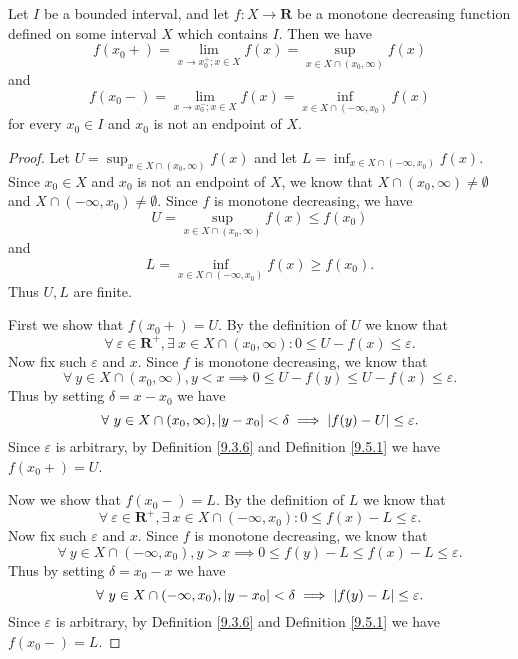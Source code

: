 \begin{additional corollary}\label{ac 11.8.2}
Let \(I\) be a bounded interval, and let \(f : X \to \mathbf{R}\) be a monotone decreasing function defined on some interval \(X\) which contains \(I\).
Then we have
\[
    f(x_0+) = \lim_{x \to x_0^+ ; x \in X} f(x) = \sup_{x \in X \cap (x_0, \infty)} f(x)
\]
and
\[
    f(x_0-) = \lim_{x \to x_0^- ; x \in X} f(x) = \inf_{x \in X \cap (-\infty, x_0)} f(x)
\]
for every \(x_0 \in I\) and \(x_0\) is not an endpoint of \(X\).
\end{additional corollary}

\begin{proof}
    Let \(U = \sup_{x \in X \cap (x_0, \infty)} f(x)\) and let \(L = \inf_{x \in X \cap (-\infty, x_0)} f(x)\).
    Since \(x_0 \in X\) and \(x_0\) is not an endpoint of \(X\), we know that \(X \cap (x_0, \infty) \neq \emptyset\) and \(X \cap (-\infty, x_0) \neq \emptyset\).
    Since \(f\) is monotone decreasing, we have
    \[
        U = \sup_{x \in X \cap (x_0, \infty)} f(x) \leq f(x_0)
    \]
    and
    \[
        L = \inf_{x \in X \cap (-\infty, x_0)} f(x) \geq f(x_0).
    \]
    Thus \(U, L\) are finite.

    First we show that \(f(x_0+) = U\).
    By the definition of \(U\) we know that
    \[
        \forall\ \varepsilon \in \mathbf{R}^+, \exists\ x \in X \cap (x_0, \infty) : 0 \leq U - f(x) \leq \varepsilon.
    \]
    Now fix such \(\varepsilon\) and \(x\).
    Since \(f\) is monotone decreasing, we know that
    \[
        \forall\ y \in X \cap (x_0, \infty), y < x \implies 0 \leq U - f(y) \leq U - f(x) \leq \varepsilon.
    \]
    Thus by setting \(\delta = x - x_0\) we have
    \[
        \forall\ y \in X \cap (x_0, \infty), \abs*{y - x_0} < \delta \implies \abs*{f(y) - U} \leq \varepsilon.
    \]
    Since \(\varepsilon\) is arbitrary, by Definition \ref{9.3.6} and Definition \ref{9.5.1} we have \(f(x_0+) = U\).

    Now we show that \(f(x_0-) = L\).
    By the definition of \(L\) we know that
    \[
        \forall\ \varepsilon \in \mathbf{R}^+, \exists\ x \in X \cap (-\infty, x_0) : 0 \leq f(x) - L \leq \varepsilon.
    \]
    Now fix such \(\varepsilon\) and \(x\).
    Since \(f\) is monotone decreasing, we know that
    \[
        \forall\ y \in X \cap (-\infty, x_0), y > x \implies 0 \leq f(y) - L \leq f(x) - L \leq \varepsilon.
    \]
    Thus by setting \(\delta = x_0 - x\) we have
    \[
        \forall\ y \in X \cap (-\infty, x_0), \abs*{y - x_0} < \delta \implies \abs*{f(y) - L} \leq \varepsilon.
    \]
    Since \(\varepsilon\) is arbitrary, by Definition \ref{9.3.6} and Definition \ref{9.5.1} we have \(f(x_0-) = L\).
\end{proof}

